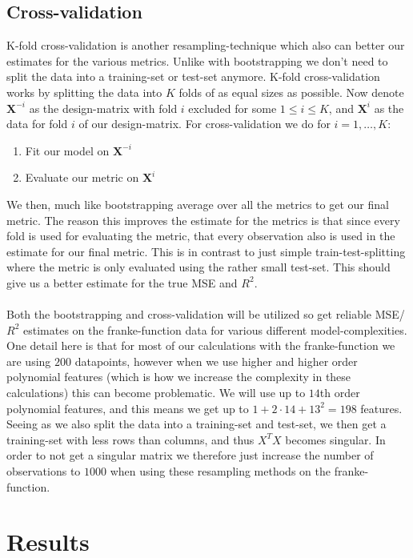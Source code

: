 \documentclass{article}
\begin{document}
\subsection{Cross-validation}
K-fold cross-validation is another resampling-technique which also can better
our estimates for the various metrics. Unlike with bootstrapping we don't need
to split the data into a training-set or test-set anymore. K-fold
cross-validation works by splitting the data into $K$ folds of as equal sizes as
possible. Now denote $\mathbf{X}^{-i}$ as the design-matrix with fold $i$
excluded for some $1 \leq i \leq K$, and $\mathbf{X}^i$ as the data for fold $i$
of our design-matrix. For cross-validation we do for $i = 1, \dots, K$:
\begin{enumerate}
    \item Fit our model on $\mathbf{X}^{-i}$
    \item Evaluate our metric on $\mathbf{X}^{i}$
\end{enumerate}
We then, much like bootstrapping average over all the metrics to get our final
metric. The reason this improves the estimate for the metrics is that since
every fold is used for evaluating the metric, that every observation also is
used in the estimate for our final metric. This is in contrast to just simple
train-test-splitting where the metric is only evaluated using the rather small
test-set.  This should give us a better estimate for the true MSE and $R^2$.
\\\\
Both the bootstrapping and cross-validation will be utilized so get reliable
MSE/$R^2$ estimates on the franke-function data for various different
model-complexities. One detail here is that for most of our calculations with
the franke-function we are using $200$ datapoints, however when we use higher
and higher order polynomial features (which is how we increase the complexity in
these calculations) this can become problematic. We will use up to $14$th order
polynomial features, and this means we get up to $1+2\cdot 14+13^2 = 198$
features. Seeing as we also split the data into a training-set and test-set, we
then get a training-set with less rows than columns, and thus $X^T X$ becomes
singular. In order to not get a singular matrix we therefore just increase the
number of observations to $1000$ when using these resampling methods on the
franke-function.
\section{Results}
\end{document}
